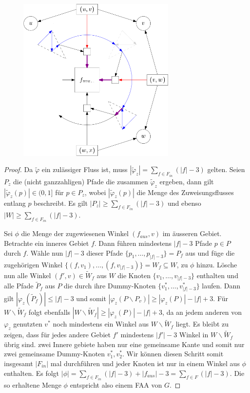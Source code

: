 \begin{figure}[h]
	\centering
  	\includegraphics[width=0.7\textwidth]{face_cut_example.png}
  	\caption{}
\end{figure}



\begin{proof}
Da $\tilde{\varphi}$ ein zulässiger Fluss ist, muss $|\tilde{\varphi}_z| = \sum_{f \in F_{in}}(|f|-3)$ gelten. Seien $P_z$ die (nicht ganzzahligen) Pfade die zusammen $\tilde{\varphi}_z$ ergeben, dann gilt $|\tilde{\varphi}_z(p)| \in (0,1]$ für $p \in P_z$, wobei $|\tilde{\varphi}_z(p)|$ die Menge des Zuweisungsflusses entlang $p$ beschreibt. Es gilt $|P_z| \geq \sum_{f \in F_{in}}(|f|-3)$ und ebenso $|W| \geq \sum_{f \in F_{in}}(|f|-3)$.

Sei $\phi$ die Menge der zugewiesenen Winkel $(f_{aus},v)$ im äusseren Gebiet. Betrachte ein inneres Gebiet $f$. Dann führen mindestens $|f|-3$ Pfade $p \in P$ durch $f$. Wähle nun $|f|-3$ dieser Pfade $\{p_1, \dotsc , p_{|f|-3}\} = P_f$ aus und füge die zugehörigen Winkel $\{(f,v_1), \dotsc , (f,v_{|f|-3})\} = W_f \subseteq W$, zu $\phi$ hinzu. Lösche nun alle Winkel $(f',v)\in \tilde{W}_f$ aus $W$ die Knoten $\{v_1, \dotsc , v_{|f|-3}\}$ enthalten und alle Pfade $\tilde{P}_f$ aus $P$ die durch ihre Dummy-Knoten $\{v^*_1, \dotsc , v^*_{|f|-3}\}$ laufen. Dann gilt $|\varphi_z(\tilde{P}_f)| \leq |f|-3$ und somit $|\varphi_z(P\backslash P_v)| \geq |\varphi_z(P)| - |f| + 3$. Für $W \backslash \tilde{W}_f$ folgt ebenfalls $|W \backslash \tilde{W}_f| \geq |\varphi_z(P)| - |f| + 3$, da an jedem anderen von $\varphi_z$ genutzten $v^*$ noch mindestens ein Winkel aus $W\backslash \tilde{W}_f$ liegt. 
Es bleibt zu zeigen, dass für jedes andere Gebiet $f'$ mindestens $|f'|-3$ Winkel in $W\backslash \tilde{W}_f$ übrig sind. zwei Innere gebiete haben nur eine gemeinsame Kante und somit nur zwei gemeinsame Dummy-Knoten $v^*_1,v^*_2$.  
Wir können diesen Schritt somit insgesamt $|F_{in}|$ mal durchführen und jeder Knoten ist nur in einem Winkel aus $\phi$ enthalten. Es folgt $|\phi| = \sum_{f \in F_{in}}(|f|-3) + |f_{aus}| - 3 = \sum_{f \in F}(|f|-3)$. Die so erhaltene Menge $\phi$ entspricht also einem FAA von $G$.
\end{proof}
